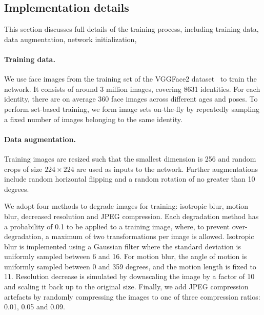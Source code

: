 \documentclass[runningheads]{llncs}
\begin{document}
\subsection{Implementation details}
\label{sec:imp}
This section discusses full details of the 
training process, including training data,
data augmentation,
network initialization, \etc

\paragraph{Training data.} 
We use face images from the training set of the
VGGFace2 dataset~\cite{Cao18} to train the network.
It consists of around 3 million images, covering 
8631 identities. For 
each identity, there are on average 360 face 
images across different ages and poses.
To perform set-based training,
we form image sets on-the-fly by repeatedly sampling
a fixed number of images belonging to the same identity.

\paragraph{Data augmentation.}
Training images are resized such that the smallest 
dimension is 256 and random crops of size 
$224 \times 224$ are used as inputs to the 
network. Further augmentations include random
horizontal flipping and a random rotation of 
no greater than 10 degrees.

We adopt four methods to degrade images for training:
isotropic blur, motion blur, decreased resolution and JPEG compression.
Each degradation method has a 
probability 
of 0.1 to be applied to a training image,
where, to prevent over-degradation, a maximum of
two transformations per image is allowed.
Isotropic blur is implemented using a Gaussian filter
where the standard deviation is uniformly sampled between 6 and 16.
For motion blur, the angle of motion is uniformly sampled
between 0 and 359 degrees, and the motion length is fixed to 11. 
Resolution decrease is simulated by downscaling the image by a factor of 10
and scaling it back up to the original size.
Finally, we add JPEG compression artefacts by randomly compressing
the images to one of three compression ratios: 0.01, 0.05 and 0.09.
\end{document}
